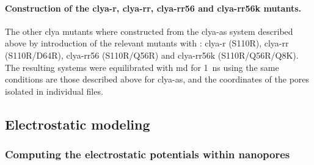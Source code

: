 \paragraph{Construction of the \gls{clya-r}, \gls{clya-rr}, \gls{clya-rr56} and \gls{clya-rr56k} mutants.}
%
The other \gls{clya} mutants where constructed from the \gls{clya-as} system described above by introduction
of the relevant mutants with : \gls{clya-r} (S110R), \gls{clya-rr} (S110R/D64R), \gls{clya-rr56}
(S110R/Q56R) and \gls{clya-rr56k} (S110R/Q56R/Q8K). The resulting systems were equilibrated with \gls{md} for
\SI{1}{\ns} using the same conditions are those described above for \gls{clya-as}, and the coordinates of the
pores isolated in individual files.


\subsection{Electrostatic modeling}
%
\label{sec:elec:methods:elec}

\subsubsection{Computing the electrostatic potentials within nanopores}
%

